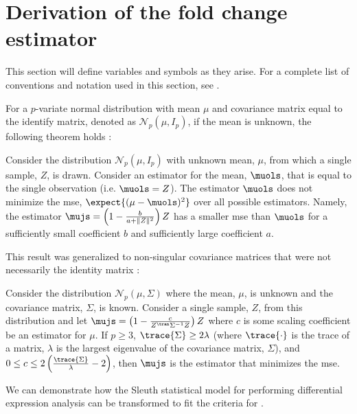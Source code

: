 \section{Derivation of the  fold change estimator}
\label{sec:JS_derivation}

This section will define variables and symbols as they arise.
For a complete list of conventions and notation used in this section, see .

For a $p$-variate normal distribution with mean $\mu$ and covariance matrix equal to the identify matrix, denoted as $\mathcal{N}_p(\mu, I_p)$, if the mean is unknown, the following theorem holds \cite{steinInadmissibilityUsualEstimator1956}:

\begin{theorem}
  Consider the distribution $\mathcal{N}_p \left( \mu, I_p \right)$ with unknown mean, $\mu$, from which a single sample, $Z$, is drawn.
  Consider an estimator for the mean, $\muols$, that is equal to the single observation (i.e. $\muols = Z$).
  The estimator $\muols$ does not minimize the \gls{mse}, $\expect{(\mu - \muols)^2}$ over all possible estimators.
  Namely, the estimator $\mujs = \left( 1 - \frac{b}{a + \Vert Z \Vert ^2}\right) Z$ has a smaller \gls{mse} than $\muols$ for a sufficiently small coefficient $b$ and sufficiently large coefficient $a$.
\end{theorem}

This result was generalized to non-singular covariance matrices that were not necessarily the identity matrix \cite{jamesEstimationQuadraticLoss1961,bockMinimaxEstimatorsMean1975}:

\begin{theorem}
  Consider the distribution $\mathcal{N}_p \left(\mu, \Sigma \right)$ where the mean, $\mu$, is unknown and the covariance matrix, $\Sigma$, is known.
  Consider a single sample, $Z$, from this distribution and let $\mujs = \left( 1 - \frac{c}{Z^\tran \Sigma^{-1} Z}\right) Z$ where $c$ is some scaling coefficient be an estimator for $\mu$.
  If $p \ge 3$, $\trace{\Sigma} \ge 2 \lambda$ (where $\trace{\cdot}$ is the trace of a matrix, $\lambda$ is the largest eigenvalue of the covariance matrix, $\Sigma$), and $0 \le c \le 2 \left( \frac{\trace{\Sigma}}{\lambda} - 2 \right)$, then $\mujs$ is the estimator that minimizes the \gls{mse}.
  \label{thm:js}
\end{theorem}

We can demonstrate how the Sleuth statistical model for performing differential expression analysis \cite{pimentelDifferentialAnalysisRNAseq2017,yiGenelevelDifferentialAnalysis2018} can be transformed to fit the criteria for .

